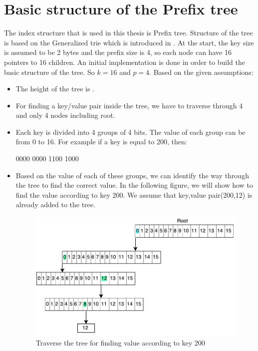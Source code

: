 \documentclass{report}
\begin{document}
\section{Basic structure of the Prefix tree}
 
 The index structure that is used in this thesis is Prefix tree. Structure of the tree is based on the Generalized trie which is introduced in \cite{Boehm}.  At the start, the key size is assumed to be 2 bytes and the prefix size is 4, so each node can have 16 pointers to 16 children. An initial implementation is done in order to build the basic structure of the tree. So $k=16$ and $p=4$. Based on the given assumptions:  

\begin{itemize}
  \item The height of the tree is .
  \item For finding a key/value pair inside the tree, we have to traverse through 4 and only 4 nodes including root.
  \item Each key is divided into 4 groups of 4 bits. The value of each group can be from 0 to 16. For example if a key is equal to 200, then:
  
  0000 0000 1100 1000 \\ 
  \item Based on the value of each of these groups, we can identify the way through the tree to find the correct value. In the following figure, we will show how to find the value according to key 200. We assume that key,value pair(200,12) is already added to the tree.
  
\begin{figure}[h]
\includegraphics[scale=0.6]{tree}
\caption{ Traverse the tree for finding value according to key 200}
\centering

\end{figure}
\end{itemize}
\end{document}
